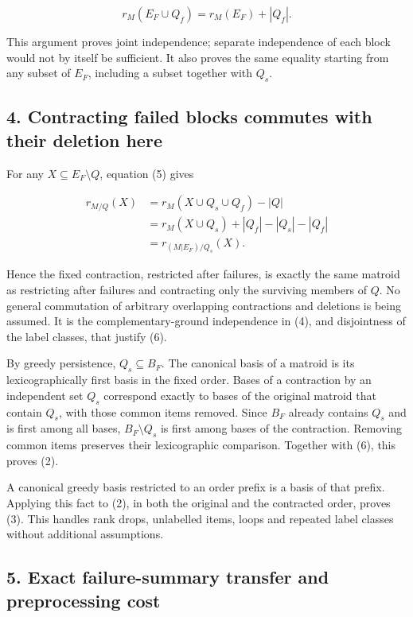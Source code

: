 \[
r_M(E_F\cup Q_f)=r_M(E_F)+|Q_f|.
\tag{5}
\]

This argument proves joint independence; separate independence of each block would not by itself be sufficient. It also proves the same equality starting from any subset of \(E_F\), including a subset together with \(Q_s\).

\hypertarget{af-b2bf8a6e14-contracting-failed-blocks-commutes-with-their-deletion-here}{%
\subsection{4. Contracting failed blocks commutes with their deletion here}\label{af-b2bf8a6e14-contracting-failed-blocks-commutes-with-their-deletion-here}}

For any \(X\subseteq E_F\setminus Q\), equation (5) gives

\[
\begin{aligned}
r_{M/Q}(X)
 &=r_M(X\cup Q_s\cup Q_f)-|Q|\\
 &=r_M(X\cup Q_s)+|Q_f|-|Q_s|-|Q_f|\\
 &=r_{(M|E_F)/Q_s}(X).
\end{aligned}
\tag{6}
\]

Hence the fixed contraction, restricted after failures, is exactly the same matroid as restricting after failures and contracting only the surviving members of \(Q\). No general commutation of arbitrary overlapping contractions and deletions is being assumed. It is the complementary-ground independence in (4), and disjointness of the label classes, that justify (6).

By greedy persistence, \(Q_s\subseteq B_F\). The canonical basis of a matroid is its lexicographically first basis in the fixed order. Bases of a contraction by an independent set \(Q_s\) correspond exactly to bases of the original matroid that contain \(Q_s\), with those common items removed. Since \(B_F\) already contains \(Q_s\) and is first among all bases, \(B_F\setminus Q_s\) is first among bases of the contraction. Removing common items preserves their lexicographic comparison. Together with (6), this proves (2).

A canonical greedy basis restricted to an order prefix is a basis of that prefix. Applying this fact to (2), in both the original and the contracted order, proves (3). This handles rank drops, unlabelled items, loops and repeated label classes without additional assumptions.

\hypertarget{af-b2bf8a6e14-exact-failure-summary-transfer-and-preprocessing-cost}{%
\subsection{5. Exact failure-summary transfer and preprocessing cost}\label{af-b2bf8a6e14-exact-failure-summary-transfer-and-preprocessing-cost}}

